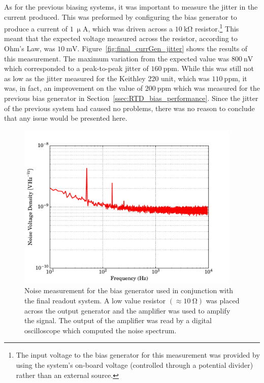 As for the previous biasing systems, it was important to measure the jitter in the current produced. This was preformed by configuring the bias generator to produce a current of $1~\mathrm{\upmu A}$, which was driven across a $10~\mathrm{k\Omega}$ resistor.\footnote{The input voltage to the bias generator for this measurement was provided by using the system's on-board voltage (controlled through a potential divider) rather than an external source.} This meant that the expected voltage measured across the resistor, according to Ohm's Law, was $10~\mathrm{mV}$. Figure~\ref{fig:final_currGen_jitter} shows the results of this measurement. The maximum variation from the expected value was $800~\mathrm{nV}$ which corresponded to a peak-to-peak jitter of $160~\mathrm{ppm}$. While this was still not as low as the jitter measured for the Keithley 220 unit, which was $110~\mathrm{ppm}$, it was, in fact, an improvement on the value of $200~\mathrm{ppm}$ which was measured for the previous bias generator in Section~\ref{ssec:RTD_bias_performance}. Since the jitter of the previous system had caused no problems, there was no reason to conclude that any issue would be presented here.
\begin{figure}[tb]
\begin{center}
\includegraphics[width = 0.95\textwidth]{figures/final_bias_noise}
\caption[Noise measurement for bias generator used in conjuncture with the final readout system.]{Noise measurement for the bias generator used in conjunction with the final readout system. A low value resistor $\left(\approx 10~\mathrm{\Omega}\right)$ was placed across the output generator and the amplifier was used to amplify the signal. The output of the amplifier was read by a digital oscilloscope which computed the noise spectrum.}
\label{fig:final_currGen_noise}
\end{center}
\end{figure}
